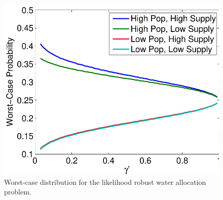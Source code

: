 \documentclass[11pt]{article}
\begin{document}
\begin{figure}
	\centering
	\includegraphics[width=.5\textwidth]{images/worst_case_probability}
	\caption{Worst-case distribution for the likelihood robust water allocation problem.}
	\label{fig:worst_case}
\end{figure}


% 
\end{document}
